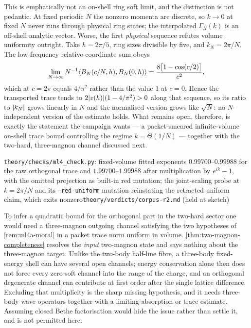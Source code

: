 \begin{scope}
This is emphatically not an on-shell ring soft limit, and the distinction is
not pedantic. At fixed periodic $N$ the nonzero momenta are discrete, so
$k\to0$ at fixed $N$ never runs through physical ring states; the interpolated
$\Gamma_N(k)$ is an off-shell analytic vector. Worse, the first \emph{physical}
sequence refutes volume uniformity outright. Take $h=2\pi/5$, ring sizes
divisible by five, and $k_N=2\pi/N$. The low-frequency relative-coordinate sum
obeys
\begin{equation}
  \lim_{N\to\infty}N^{-1}\langle B_N(c/N,h),B_N(0,h)\rangle
   =\frac{8\bigl[1-\cos(c/2)\bigr]}{c^2},
\end{equation}
which at $c=2\pi$ equals $4/\pi^2$ rather than the value $1$ at $c=0$. Hence
the transported trace tends to $2\lvert v(h)\rvert(1-4/\pi^2)>0$ along that sequence,
so its ratio to $\lvert k_N\rvert$ grows linearly in $N$ and the normalised version
grows like $\sqrt N$: no $N$-independent version of the estimate holds. What
remains open, therefore, is exactly the statement the campaign wants --- a
packet-smeared infinite-volume on-shell trace bound controlling the regime
$k=\Theta(1/N)$ --- together with the two-hard, three-magnon channel discussed
next.
\end{scope}
%
{\texttt{theory/checks/ml4\_check.py}: fixed-volume fitted exponents
$0.99700$--$0.99988$ for the raw orthogonal trace and
$1.99700$--$1.99988$ after multiplication by $e^{ik}-1$, with the omitted
projection as built-in red mutation; the joint-scaling probe at $k=2\pi/N$ and
its \texttt{--red-uniform} mutation reinstating the retracted uniform claim,
which exits nonzero}{\texttt{theory/verdicts/corpus-r2.md} (held at sketch)}

\begin{remark}
\label{rem:ml4-3}
To infer a quadratic bound for the orthogonal part in the two-hard sector one
would need a three-magnon outgoing channel satisfying the two hypotheses of
\cref{rem:ml4a-moral} in a packet trace norm uniform in volume.
\cref{thm:two-magnon-completeness} resolves the \emph{input} two-magnon state
and says nothing about the three-magnon target. Unlike the two-body half-line
fibre, a three-body fixed-energy shell can have several open channels; energy
conservation alone then does not force every zero-soft channel into the range
of the charge, and an orthogonal degenerate channel can contribute at first
order after the single lattice difference. Excluding that multiplicity is the
sharp missing hypothesis, and it needs three-body wave operators together with
a limiting-absorption or trace estimate. Assuming closed Bethe factorisation
would hide the issue rather than settle it, and is not permitted here.
\end{remark}

